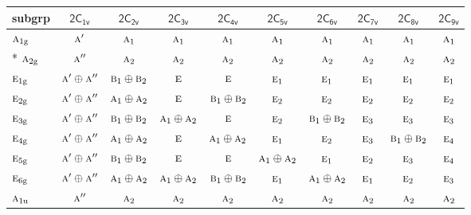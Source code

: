 \documentclass[10pt,a4paper]{article}
\numberwithin{equation}{section}
\newcommand{\grp}[1]{\mathsf{#1}}
\newcommand{\irr}[1]{\text{\normalfont\scshape #1}}
\newcommand{\ptag}[1]{\mathrm{#1}}
\begin{document}
{\small\begin{longtable}{@{}lccccccccc@{}}\toprule
subgrp & \href{2C1v.pdf}{$\grp{2C_{1v}}$} & \href{2C2v.pdf}{$\grp{2C_{2v}}$} & \href{2C3v.pdf}{$\grp{2C_{3v}}$} & \href{2C4v.pdf}{$\grp{2C_{4v}}$} & \href{2C5v.pdf}{$\grp{2C_{5v}}$} & \href{2C6v.pdf}{$\grp{2C_{6v}}$} & \href{2C7v.pdf}{$\grp{2C_{7v}}$} & \href{2C8v.pdf}{$\grp{2C_{8v}}$} & \href{2C9v.pdf}{$\grp{2C_{9v}}$}\\\midrule\endhead
\bottomrule\endfoot\endlastfoot
$\irr{a}_{1\ptag{g}}$ & $\irr{a}'$ & $\irr{a}_{1}$ & $\irr{a}_{1}$ & $\irr{a}_{1}$ & $\irr{a}_{1}$ & $\irr{a}_{1}$ & $\irr{a}_{1}$ & $\irr{a}_{1}$ & $\irr{a}_{1}$\\*
$\irr{a}_{2\ptag{g}}$ & $\irr{a}''$ & $\irr{a}_{2}$ & $\irr{a}_{2}$ & $\irr{a}_{2}$ & $\irr{a}_{2}$ & $\irr{a}_{2}$ & $\irr{a}_{2}$ & $\irr{a}_{2}$ & $\irr{a}_{2}$\\
$\irr{e}_{1\ptag{g}}$ & $\irr{a}'\oplus \irr{a}''$ & $\irr{b}_{1}\oplus \irr{b}_{2}$ & $\irr{e}$ & $\irr{e}$ & $\irr{e}_{1}$ & $\irr{e}_{1}$ & $\irr{e}_{1}$ & $\irr{e}_{1}$ & $\irr{e}_{1}$\\
$\irr{e}_{2\ptag{g}}$ & $\irr{a}'\oplus \irr{a}''$ & $\irr{a}_{1}\oplus \irr{a}_{2}$ & $\irr{e}$ & $\irr{b}_{1}\oplus \irr{b}_{2}$ & $\irr{e}_{2}$ & $\irr{e}_{2}$ & $\irr{e}_{2}$ & $\irr{e}_{2}$ & $\irr{e}_{2}$\\
$\irr{e}_{3\ptag{g}}$ & $\irr{a}'\oplus \irr{a}''$ & $\irr{b}_{1}\oplus \irr{b}_{2}$ & $\irr{a}_{1}\oplus \irr{a}_{2}$ & $\irr{e}$ & $\irr{e}_{2}$ & $\irr{b}_{1}\oplus \irr{b}_{2}$ & $\irr{e}_{3}$ & $\irr{e}_{3}$ & $\irr{e}_{3}$\\
$\irr{e}_{4\ptag{g}}$ & $\irr{a}'\oplus \irr{a}''$ & $\irr{a}_{1}\oplus \irr{a}_{2}$ & $\irr{e}$ & $\irr{a}_{1}\oplus \irr{a}_{2}$ & $\irr{e}_{1}$ & $\irr{e}_{2}$ & $\irr{e}_{3}$ & $\irr{b}_{1}\oplus \irr{b}_{2}$ & $\irr{e}_{4}$\\
$\irr{e}_{5\ptag{g}}$ & $\irr{a}'\oplus \irr{a}''$ & $\irr{b}_{1}\oplus \irr{b}_{2}$ & $\irr{e}$ & $\irr{e}$ & $\irr{a}_{1}\oplus \irr{a}_{2}$ & $\irr{e}_{1}$ & $\irr{e}_{2}$ & $\irr{e}_{3}$ & $\irr{e}_{4}$\\
$\irr{e}_{6\ptag{g}}$ & $\irr{a}'\oplus \irr{a}''$ & $\irr{a}_{1}\oplus \irr{a}_{2}$ & $\irr{a}_{1}\oplus \irr{a}_{2}$ & $\irr{b}_{1}\oplus \irr{b}_{2}$ & $\irr{e}_{1}$ & $\irr{a}_{1}\oplus \irr{a}_{2}$ & $\irr{e}_{1}$ & $\irr{e}_{2}$ & $\irr{e}_{3}$\\
$\irr{a}_{1\ptag{u}}$ & $\irr{a}''$ & $\irr{a}_{2}$ & $\irr{a}_{2}$ & $\irr{a}_{2}$ & $\irr{a}_{2}$ & $\irr{a}_{2}$ & $\irr{a}_{2}$ & $\irr{a}_{2}$ & $\irr{a}_{2}$\\

\end{longtable}}
\end{document}
